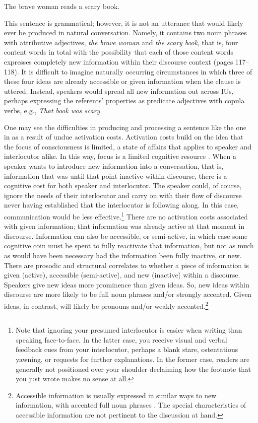          The brave woman reads a scary book.
    \z

\noindent This sentence is grammatical; however, it is not an utterance that would likely ever be produced in natural conversation. Namely, it contains two noun phrases with attributive adjectives, \textit{the brave woman} and \textit{the scary book}, that is, four content words in total with the possibility that each of those content words expresses completely new information within their discourse context (pages 117--118). It is difficult to imagine naturally occurring circumstances in which three of these four ideas are already accessible or given information when the clause is uttered. Instead, speakers would spread all new information out across IUs, perhaps expressing the referents’ properties as predicate adjectives with copula verbs, e.g., \textit{That book was scary}.

One may see the difficulties in producing and processing a sentence like the one in  as a result of undue activation costs. Activation costs build on the idea that the focus of consciousness is limited, a state of affairs that applies to speaker and interlocutor alike. In this way, focus is a limited cognitive resource \citep[71--81]{Chafe1994}. When a speaker wants to introduce new information into a conversation, that is, information that was until that point inactive within discourse, there is a cognitive cost for both speaker and interlocutor. The speaker could, of course, ignore the needs of their interlocutor and carry on with their flow of discourse never having established that the interlocutor is following along. In this case, communication would be less effective.\footnote{{Note that ignoring your presumed interlocutor is easier when writing than speaking face-to-face. In the latter case, you receive visual and verbal feedback cues from your interlocutor, perhaps a blank stare, ostentatious yawning, or requests for further explanations. In the former case, readers are generally not positioned over your shoulder declaiming how the footnote that you just wrote makes no sense at all.} } There are no activation costs associated with given information; that information was already active at that moment in discourse. Information can also be accessible, or semi-active, in which case some cognitive coin must be spent to fully reactivate that information, but not as much as would have been necessary had the information been fully inactive, or new. There are prosodic and structural correlates to whether a piece of information is given (active), accessible (semi-active), and new (inactive) within a discourse. Speakers give new ideas more prominence than given ideas. So, new ideas within discourse are more likely to be full noun phrases and/or strongly accented. Given ideas, in contrast, will likely be pronouns and/or weakly accented.\footnote{{Accessible information is usually expressed in similar ways to new information, with accented full noun phrases \citep[75]{Chafe1994}. The special characteristics of accessible information are not pertinent to the discussion at hand.} }

